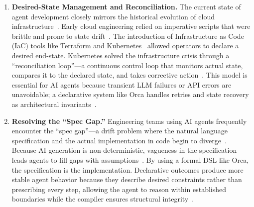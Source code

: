 \documentclass[sigconf,nonacm]{acmart}
\begin{document}
\begin{enumerate}[leftmargin=*]
  \item \textbf{Desired-State Management and Reconciliation.} The current
        state of agent development closely mirrors the historical evolution
        of cloud infrastructure~\cite{docker2025cagent}. Early
        cloud engineering relied on imperative scripts that were brittle and
        prone to state drift~\cite{burns2016borg}. The introduction of
        Infrastructure as Code (IaC) tools like Terraform and
        Kubernetes~\cite{burns2016borg} allowed operators to declare a
        desired end-state. Kubernetes solved the infrastructure crisis
        through a ``reconciliation loop''---a continuous control loop that
        monitors actual state, compares it to the declared state, and takes
        corrective action~\cite{burns2016borg,docker2025cagent}. This model is
        essential for AI agents because transient LLM failures or API errors
        are unavoidable; a declarative system like Orca handles retries and
        state recovery as architectural invariants~\cite{docker2025cagent}.

  \item \textbf{Resolving the ``Spec Gap.''} Engineering teams using AI
        agents frequently encounter the ``spec gap''---a drift problem where
        the natural language specification and the actual implementation in
        code begin to diverge~\cite{docker2025cagent}. Because AI generation
        is non-deterministic, vagueness in the specification leads agents to
        fill gaps with assumptions~\cite{docker2025cagent}. By using a
        formal DSL like Orca, the specification is the implementation.
        Declarative outcomes produce more stable agent behavior because they
        describe desired constraints rather than prescribing every step,
        allowing the agent to reason within established boundaries while the
        compiler ensures structural integrity~\cite{docker2025cagent,wang2025semanticrouter}.


\end{enumerate}
\end{document}
